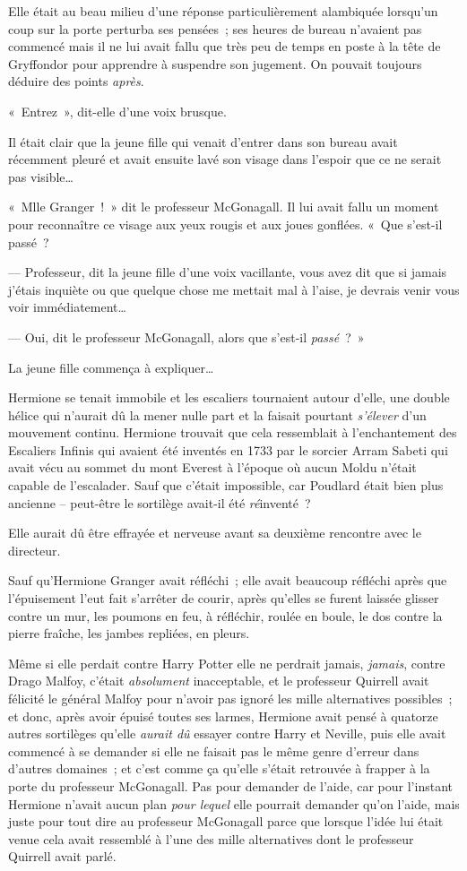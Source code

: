 Elle était au beau milieu d'une réponse particulièrement alambiquée lorsqu'un coup sur la porte perturba ses pensées~; ses heures de bureau n'avaient pas commencé mais il ne lui avait fallu que très peu de temps en poste à la tête de Gryffondor pour apprendre à suspendre son jugement.
On pouvait toujours déduire des points \emph{après}.

«~Entrez~», dit-elle d'une voix brusque.

Il était clair que la jeune fille qui venait d'entrer dans son bureau avait récemment pleuré et avait ensuite lavé son visage dans l'espoir que ce ne serait pas visible…

«~Mlle Granger~!~»
dit le professeur McGonagall.
Il lui avait fallu un moment pour reconnaître ce visage aux yeux rougis et aux joues gonflées.
«~Que s'est-il passé~?

--- Professeur, dit la jeune fille d'une voix vacillante, vous avez dit que si jamais j'étais inquiète ou que quelque chose me mettait mal à l'aise, je devrais venir vous voir immédiatement…

--- Oui, dit le professeur McGonagall, alors que s'est-il \emph{passé}~?~»

La jeune fille commença à expliquer…

\later

Hermione se tenait immobile et les escaliers tournaient autour d'elle, une double hélice qui n'aurait dû la mener nulle part et la faisait pourtant \emph{s'élever} d'un mouvement continu.
Hermione trouvait que cela ressemblait à l'enchantement des Escaliers Infinis qui avaient été inventés en 1733 par le sorcier Arram Sabeti qui avait vécu au sommet du mont Everest à l'époque où aucun Moldu n'était capable de l'escalader.
Sauf que c'était impossible, car Poudlard était bien plus ancienne -- peut-être le sortilège avait-il été \emph{ré}inventé~?

Elle aurait dû être effrayée et nerveuse avant sa deuxième rencontre avec le directeur.

Sauf qu'Hermione Granger avait réfléchi~; elle avait beaucoup réfléchi après que l'épuisement l'eut fait s'arrêter de courir, après qu'elles se furent laissée glisser contre un mur, les poumons en feu, à réfléchir, roulée en boule, le dos contre la pierre fraîche, les jambes repliées, en pleurs.

Même si elle perdait contre Harry Potter elle ne perdrait jamais, \emph{jamais}, contre Drago Malfoy, c'était \emph{absolument} inacceptable, et le professeur Quirrell avait félicité le général Malfoy pour n'avoir pas ignoré les mille alternatives possibles~; et donc, après avoir épuisé toutes ses larmes, Hermione avait pensé à quatorze autres sortilèges qu'elle \emph{aurait dû} essayer contre Harry et Neville, puis elle avait commencé à se demander si elle ne faisait pas le même genre d'erreur dans d'autres domaines~; et c'est comme ça qu'elle s'était retrouvée à frapper à la porte du professeur McGonagall.
Pas pour demander de l'aide, car pour l'instant Hermione n'avait aucun plan \emph{pour lequel} elle pourrait demander qu'on l'aide, mais juste pour tout dire au professeur McGonagall parce que lorsque l'idée lui était venue cela avait ressemblé à l'une des mille alternatives dont le professeur Quirrell avait parlé.

